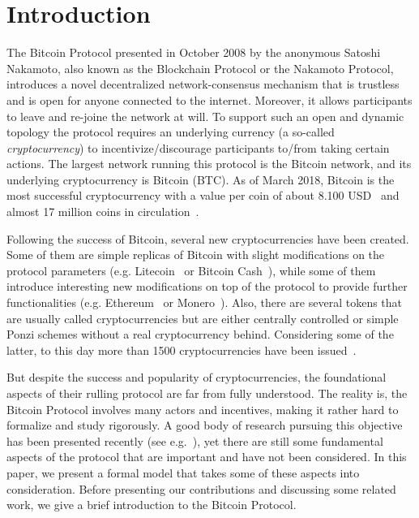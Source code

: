 \section{Introduction}

The Bitcoin Protocol \cite{Bitcoin} presented in October 2008 by the anonymous Satoshi Nakamoto, also known as the Blockchain Protocol or the Nakamoto Protocol, introduces a novel decentralized network-consensus mechanism that is trustless and is open for anyone connected to the internet. Moreover, it allows participants to leave and re-joine the network at will. To support such an open and dynamic topology the protocol requires an underlying currency (a so-called \emph{cryptocurrency}) to incentivize/discourage participants to/from taking certain actions. The largest network running this protocol is the Bitcoin network, and its underlying cryptocurrency is Bitcoin (BTC). As of March 2018, Bitcoin is the most successful cryptocurrency with a value per coin of about 8.100 USD~\cite{BitcoinPrice} and almost 17 million coins in circulation~\cite{Totalcoins}.
 
Following the success of Bitcoin, several new cryptocurrencies have been created. Some of them are simple replicas of Bitcoin with slight modifications on the protocol parameters (e.g. Litecoin~\cite{Litecoin} or Bitcoin Cash~\cite{Bcash}), while some of them introduce interesting new modifications on top of the protocol to provide further functionalities (e.g. Ethereum~\cite{Ethereum} or Monero~\cite{Monero}). Also, there are several tokens that are usually called cryptocurrencies but are either centrally controlled or simple Ponzi schemes without a real cryptocurrency behind. Considering some of the latter, to this day more than 1500 cryptocurrencies have been issued~\cite{coinmarketcap}.

But despite the success and popularity of cryptocurrencies, the foundational aspects of their rulling protocol are far from fully understood. The reality is, the Bitcoin Protocol involves many actors and incentives, making it rather hard to formalize and study rigorously. A good body of research pursuing this objective has been presented recently (see e.g.~\cite{mininggames:2016,optimalselfishmining2017,instabilitywithoutreward:2016}), yet there are still some fundamental aspects of the protocol that are important and have not been considered. In this paper, we present a formal model that takes some of these aspects into consideration. Before presenting our contributions and discussing some related work, we give a brief introduction to the Bitcoin Protocol.

